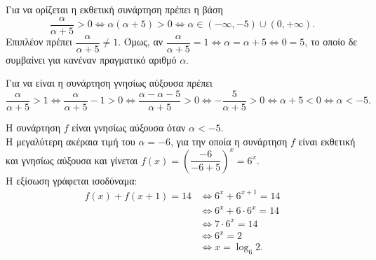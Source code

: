 \begin{alist}
\item Για να ορίζεται η εκθετική συνάρτηση πρέπει η βάση
\[\frac{\alpha}{\alpha + 5} > 0 \Leftrightarrow \alpha(\alpha + 5) > 0 \Leftrightarrow \alpha \in (-\infty, -5) \cup (0, +\infty).\]
Επιπλέον πρέπει $\dfrac{\alpha}{\alpha + 5} \ne 1$. Όμως, αν $\dfrac{\alpha}{\alpha + 5} = 1 \Leftrightarrow \alpha = \alpha + 5 \Leftrightarrow 0 = 5$, το οποίο δε συμβαίνει για κανέναν πραγματικό αριθμό $\alpha$.
\item Για να είναι η συνάρτηση γνησίως αύξουσα πρέπει
\[\frac{\alpha}{\alpha + 5} > 1 \Leftrightarrow \frac{\alpha}{\alpha + 5} - 1 > 0 \Leftrightarrow \frac{\alpha - \alpha - 5}{\alpha + 5} > 0 \Leftrightarrow -\frac{5}{\alpha + 5} > 0 \Leftrightarrow \alpha + 5 < 0 \Leftrightarrow \alpha < -5.\]
\item Η συνάρτηση $f$ είναι γνησίως αύξουσα όταν $\alpha < -5$. \\
Η μεγαλύτερη ακέραια τιμή του $\alpha = -6$, για την οποία η συνάρτηση $f$ είναι εκθετική και γνησίως αύξουσα και γίνεται $f(x) = \left(\dfrac{-6}{-6 + 5}\right)^x = 6^x$. \\
Η εξίσωση γράφεται ισοδύναμα:
\begin{align*}
f(x) + f(x+1) = 14 &\Leftrightarrow 6^x + 6^{x+1} = 14 \\
&\Leftrightarrow 6^x + 6 \cdot 6^x = 14 \\
&\Leftrightarrow 7 \cdot 6^x = 14 \\
&\Leftrightarrow 6^x = 2 \\
&\Leftrightarrow x = \log_6 2.
\end{align*}
\end{alist}

